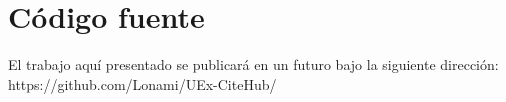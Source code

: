 \appendix
\clearpage
\appendixpage
\addappheadtotoc

\chapter{Código fuente}

El trabajo aquí presentado se publicará en un futuro bajo la siguiente dirección: https://github.com/Lonami/UEx-CiteHub/
